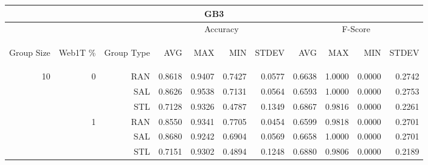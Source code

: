 \begin{center}
\begin{table}[htbp] 
 \begin{center}
\begin{tabular}{ | r | r | r | r | r | r | r | r | r | r | r |}
\hline
\multicolumn{11}{|c|}{GB3}\\
\hline
 & & & \multicolumn{4}{|c|}{Accuracy} & \multicolumn{4}{|c|}{F-Score}\\ \cline{4-11}
\begin{sideways}Group Size\end{sideways} & \begin{sideways}Web1T \%\end{sideways} & \begin{sideways}Group Type\end{sideways} & \begin{sideways}AVG\end{sideways} & \begin{sideways}MAX\end{sideways} & \begin{sideways}MIN\end{sideways} & \begin{sideways}STDEV\end{sideways} & \begin{sideways}AVG\end{sideways} & \begin{sideways}MAX\end{sideways} & \begin{sideways}MIN\end{sideways} & \begin{sideways}STDEV\end{sideways}\\
\hline
\multirow{18}{*}{10}
 & \multirow{3}{*}{0} & RAN & 0.8618 & 0.9407 & 0.7427 & 0.0577 & 0.6638 & 1.0000 & 0.0000 & 0.2742\\ \cline{3-11}
 &   & SAL & 0.8626 & 0.9538 & 0.7131 & 0.0564 & 0.6593 & 1.0000 & 0.0000 & 0.2753\\ \cline{3-11}
 &   & STL & 0.7128 & 0.9326 & 0.4787 & 0.1349 & 0.6867 & 0.9816 & 0.0000 & 0.2261\\ \cline{2-11}
 & \multirow{3}{*}{1} & RAN & 0.8550 & 0.9341 & 0.7705 & 0.0454 & 0.6599 & 0.9818 & 0.0000 & 0.2701\\ \cline{3-11}
 &   & SAL & 0.8680 & 0.9242 & 0.6904 & 0.0569 & 0.6658 & 1.0000 & 0.0000 & 0.2701\\ \cline{3-11}
 &   & STL & 0.7151 & 0.9302 & 0.4894 & 0.1248 & 0.6880 & 0.9806 & 0.0000 & 0.2189\\ \cline{2-11}

\end{tabular}
\end{center}
\end{table}
\end{center}
